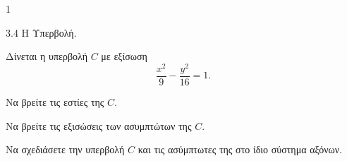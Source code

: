 \begin{ylh}{1}
    \item 3.4 Η Υπερβολή.
\end{ylh}
Δίνεται η υπερβολή $C$ με εξίσωση
\[ \frac{x^2}{9} - \frac{y^2}{16} = 1. \]
\begin{alist}
    \item Να βρείτε τις εστίες της $C$. 
    \item Να βρείτε τις εξισώσεις των ασυμπτώτων της $C$. 
    \item Να σχεδιάσετε την υπερβολή $C$ και τις ασύμπτωτες της στο ίδιο σύστημα αξόνων. 
\end{alist}